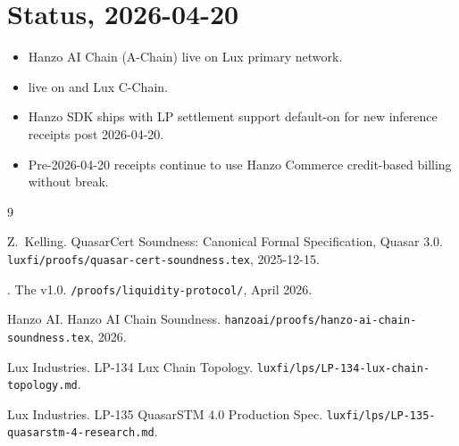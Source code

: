 \documentclass[11pt]{article}
\begin{document}
\section{Status, 2026-04-20}
\label{sec:status}

\begin{itemize}[nosep]
  \item Hanzo AI Chain (A-Chain) live on Lux primary network.
  \item  live on  and Lux C-Chain.
  \item Hanzo SDK ships with LP settlement support default-on for
        new inference receipts post 2026-04-20.
  \item Pre-2026-04-20 receipts continue to use Hanzo Commerce
        credit-based billing without break.
\end{itemize}

\begin{thebibliography}{9}

Z.~Kelling.
\newblock QuasarCert Soundness: Canonical Formal Specification, Quasar 3.0.
\newblock \texttt{luxfi/proofs/quasar-cert-soundness.tex}, 2025-12-15.

.
\newblock The  v1.0.
\newblock \texttt{/proofs/liquidity-protocol/}, April 2026.

Hanzo AI.
\newblock Hanzo AI Chain Soundness.
\newblock \texttt{hanzoai/proofs/hanzo-ai-chain-soundness.tex}, 2026.

Lux Industries.
\newblock LP-134 Lux Chain Topology.
\newblock \texttt{luxfi/lps/LP-134-lux-chain-topology.md}.

Lux Industries.
\newblock LP-135 QuasarSTM 4.0 Production Spec.
\newblock \texttt{luxfi/lps/LP-135-quasarstm-4-research.md}.

\end{thebibliography}
\end{document}

